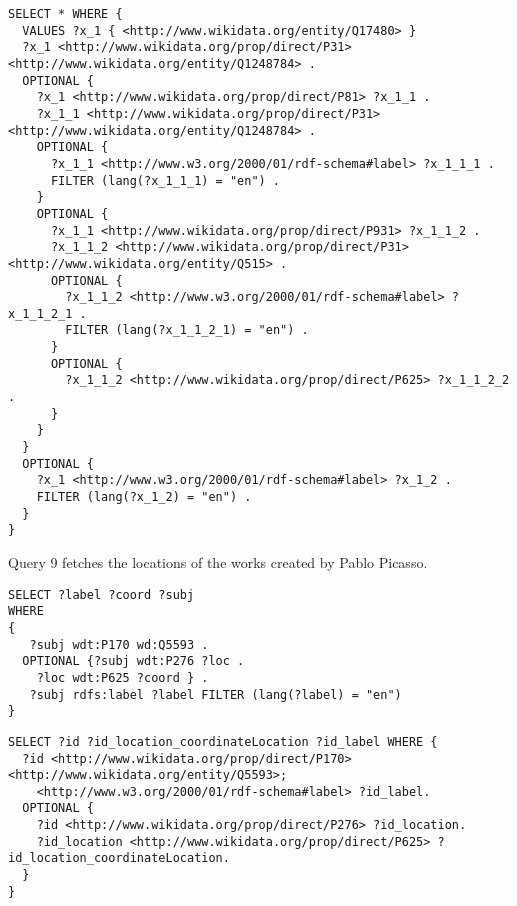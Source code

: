 \begin{minipage}{\linewidth}
\begin{lstlisting}[label=listing:listing50, caption={Query 8 - HypergraphQL}]
SELECT * WHERE {
  VALUES ?x_1 { <http://www.wikidata.org/entity/Q17480> }
  ?x_1 <http://www.wikidata.org/prop/direct/P31> <http://www.wikidata.org/entity/Q1248784> .
  OPTIONAL {
    ?x_1 <http://www.wikidata.org/prop/direct/P81> ?x_1_1 .
    ?x_1_1 <http://www.wikidata.org/prop/direct/P31> <http://www.wikidata.org/entity/Q1248784> .
    OPTIONAL {
      ?x_1_1 <http://www.w3.org/2000/01/rdf-schema#label> ?x_1_1_1 .
      FILTER (lang(?x_1_1_1) = "en") .
    }
    OPTIONAL {
      ?x_1_1 <http://www.wikidata.org/prop/direct/P931> ?x_1_1_2 .
      ?x_1_1_2 <http://www.wikidata.org/prop/direct/P31> <http://www.wikidata.org/entity/Q515> .
      OPTIONAL {
        ?x_1_1_2 <http://www.w3.org/2000/01/rdf-schema#label> ?x_1_1_2_1 .
        FILTER (lang(?x_1_1_2_1) = "en") .
      }
      OPTIONAL {
        ?x_1_1_2 <http://www.wikidata.org/prop/direct/P625> ?x_1_1_2_2 .
      }
    }
  }
  OPTIONAL {
    ?x_1 <http://www.w3.org/2000/01/rdf-schema#label> ?x_1_2 .
    FILTER (lang(?x_1_2) = "en") .
  }
}
\end{lstlisting}
\end{minipage}

Query 9 fetches the locations of the works created by Pablo Picasso.

\begin{minipage}{\linewidth}
\begin{lstlisting}[label=listing:listing51, caption={Query 9}]
SELECT ?label ?coord ?subj
WHERE
{
   ?subj wdt:P170 wd:Q5593 .
  OPTIONAL {?subj wdt:P276 ?loc .
    ?loc wdt:P625 ?coord } .
   ?subj rdfs:label ?label FILTER (lang(?label) = "en")
}
\end{lstlisting}
\end{minipage}

\begin{minipage}{\linewidth}
\begin{lstlisting}[label=listing:listing52, caption={Query 9 - GraphQL-LD}]
SELECT ?id ?id_location_coordinateLocation ?id_label WHERE {
  ?id <http://www.wikidata.org/prop/direct/P170> <http://www.wikidata.org/entity/Q5593>;
    <http://www.w3.org/2000/01/rdf-schema#label> ?id_label.
  OPTIONAL {
    ?id <http://www.wikidata.org/prop/direct/P276> ?id_location.
    ?id_location <http://www.wikidata.org/prop/direct/P625> ?id_location_coordinateLocation.
  }
}
\end{lstlisting}
\end{minipage}

